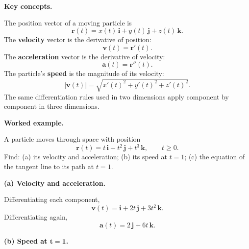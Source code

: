 \begingroup
\small

\noindent{}

\vspace{0.8em}

\noindent\textbf{Key concepts.}

The position vector of a moving particle is
\[
  \boxed{
  \mathbf{r}(t)
  = x(t)\,\mathbf{i} + y(t)\,\mathbf{j} + z(t)\,\mathbf{k}
  }.
\]
The \textbf{velocity} vector is the derivative of position:
\[
  \boxed{\mathbf{v}(t) = \mathbf{r}'(t)}.
\]
The \textbf{acceleration} vector is the derivative of velocity:
\[
  \boxed{\mathbf{a}(t) = \mathbf{r}''(t)}.
\]
The particle's \textbf{speed} is the magnitude of its velocity:
\[
  \boxed{
  |\mathbf{v}(t)|
  = \sqrt{x'(t)^{2} + y'(t)^{2} + z'(t)^{2}}
  }.
\]
The same differentiation rules used in two dimensions apply
component by component in three dimensions.

\vspace{0.8em}
\noindent\textbf{Worked example.}

\noindent A particle moves through space with position
\[
  \mathbf{r}(t) = t\,\mathbf{i} + t^{2}\,\mathbf{j}
                + t^{3}\,\mathbf{k},
  \qquad t \ge 0.
\]
Find: (a) its velocity and acceleration;\quad
      (b) its speed at $t = 1$;\quad
      (c) the equation of the tangent line to its path at $t = 1$.

\vspace{0.3em}
\noindent\textbf{(a) Velocity and acceleration.}

Differentiating each component,
\[
  \boxed{
  \mathbf{v}(t) = \mathbf{i} + 2t\,\mathbf{j} + 3t^{2}\,\mathbf{k}
  }.
\]
Differentiating again,
\[
  \boxed{
  \mathbf{a}(t) = 2\,\mathbf{j} + 6t\,\mathbf{k}
  }.
\]

\vspace{0.3em}
\noindent\textbf{(b) Speed at $\boldsymbol{t = 1}$.}

